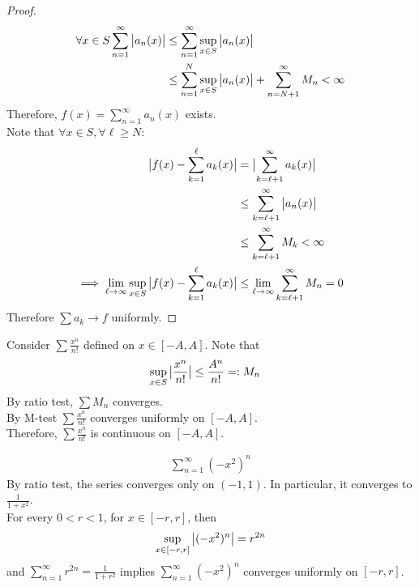 \documentclass[11pt]{article}
\begin{document}
 	\begin{proof}
 		\begin{align}
 			\forall x \in S \sum_{n=1}^\infty \big \vert {a_n(x)} \big \vert &\leq \sum_{n=1}^\infty \sup_{x \in S} \big \vert {a_n(x)} \big \vert \\
 			&\leq \sum_{n=1}^N \sup_{x \in S} \big \vert {a_n(x)} \big \vert + \sum_{n=N+1}^\infty M_n < \infty
 		\end{align}
 		Therefore, $f(x) = \sum_{n=1}^\infty a_n(x)$ exists. \\
 		Note that $\forall x \in S, \forall \ell \geq N$:
 		\begin{align}
 			\big \vert {f(x) - \sum_{k=1}^\ell a_k(x)} \big \vert &= \big \vert {\sum_{k = \ell + 1}^\infty a_k(x)} \big \vert  \\
 			&\leq \sum_{k=\ell+1}^\infty \big \vert {a_n(x)} \big \vert \\
 			&\leq \sum_{k=\ell+1}^\infty M_k < \infty \\
 			\implies \lim_{\ell \to \infty} \sup_{x \in S} \big \vert {f(x) - \sum_{k=1}^\ell a_k(x)} \big \vert &\leq \lim_{\ell \to \infty} \sum_{k=\ell+1}^\infty M_n = 0
 		\end{align}
 		Therefore $\sum a_k \to f$ uniformly.
 	\end{proof}
 	
 	\begin{example}
 		Consider $\sum \frac{x^n}{n!}$ defined on $x \in [-A, A]$. Note that
 		\begin{align}
 			\sup_{x \in S} \big \vert {\frac{x^n}{n!}} \big \vert &\leq \frac{A^n}{n!} =: M_n
 		\end{align}
 		By ratio test, $\sum M_n$ converges. \\
 		By M-test $\sum \frac{x^n}{n!}$ converges uniformly on $[-A, A]$. \\
 		Therefore, $\sum \frac{x^n}{n!}$ is continuous on $[-A, A]$.
 	\end{example}
 	
 	\begin{example}
 		\begin{align}
 			\sum_{n=1}^\infty (-x^2)^n
 		\end{align}
 		By ratio test, the series converges only on $(-1 ,1)$. In particular, it converges to $\frac{1}{1 + x^2}$. \\
 		For every $0 < r < 1$, for $x \in [-r, r]$, then 
 		\begin{align}
 			\sup_{x \in [-r, r]} \big \vert {(-x^2)^n} \big \vert = r^{2n}
 		\end{align}
 		and $\sum_{n=1}^\infty r^{2n} = \frac{1}{1+r^2}$ implies $\sum_{n=1}^\infty (-x^2)^n$ converges uniformly on $[-r, r]$.
 	\end{example}
 	
\end{document}
